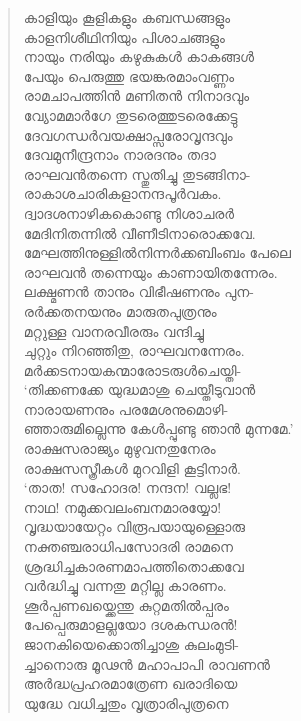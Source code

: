 \begin{verse}
കാളിയും കൂളികളും കബന്ധങ്ങളും\\
കാളനിശീഥിനിയും പിശാചങ്ങളും\\
നായും നരിയും കഴുകുകള്‍ കാകങ്ങള്‍\\
പേയും പെരുത്തു ഭയങ്കരമാംവണ്ണം\\
രാമചാപത്തിന്‍ മണിതന്‍ നിനാദവും\\
വ്യോമമാര്‍ഗേ തുടരെത്തുടരെക്കേട്ടു\\
ദേവഗന്ധര്‍വയക്ഷാപ്സരോവൃന്ദവും\\
ദേവമുനീന്ദ്രനാം നാരദനും തദാ\\
രാഘവന്‍തന്നെ സ്തുതിച്ചു തുടങ്ങിനാ-\\
രാകാശചാരികളാനന്ദപൂര്‍വകം.\\
ദ്വാദശനാഴികകൊണ്ടു നിശാചരര്‍\\
മേദിനിതന്നില്‍ വീണീടിനാരൊക്കവേ.\\
മേഘത്തിനുള്ളില്‍നിന്നര്‍ക്കബിംബം പേലെ\\
രാഘവന്‍ തന്നെയും കാണായിതന്നേരം.\\
ലക്ഷ്മണന്‍ താനും വിഭീഷണനും പുന-\\
രര്‍ക്കതനയനും മാരുതപുത്രനും\\
മറ്റുള്ള വാനരവീരരും വന്ദിച്ചു\\
ചുറ്റും നിറഞ്ഞിതു, രാഘവനന്നേരം.\\
മര്‍ക്കടനായകന്മാരോടരുള്‍ചെയ്തി-\\
‘തിക്കണക്കേ യുദ്ധമാശു ചെയ്തീടുവാന്‍\\
നാരായണനും പരമേശനുമൊഴി-\\
ഞ്ഞാരുമില്ലെന്നു കേള്‍പ്പുണ്ടു ഞാന്‍ മുന്നമേ.’\\
രാക്ഷസരാജ്യം മുഴുവനതുനേരം\\
രാക്ഷസസ്ത്രീകള്‍ മുറവിളി കൂട്ടിനാര്‍.\\
‘താത! സഹോദര! നന്ദന! വല്ലഭ!\\
നാഥ! നമുക്കവലംബനമാരയ്യോ!\\
വൃദ്ധയായേറ്റം വിരൂപയായുള്ളൊരു\\
നക്തഞ്ചരാധിപസോദരി രാമനെ\\
ശ്രദ്ധിച്ചകാരണമാപത്തിതൊക്കവേ\\
വര്‍ദ്ധിച്ചു വന്നതു മറ്റില്ല കാരണം.\\
ശൂര്‍പ്പണഖയ്ക്കെന്തു കുറ്റമതില്‍പ്പരം\\
പേപ്പെരുമാളല്ലയോ ദശകന്ധരന്‍!\\
ജാനകിയെക്കൊതിച്ചാശു കുലംമുടി-\\
ച്ചാനൊരു മൂഢന്‍ മഹാപാപി രാവണന്‍\\
അര്‍ദ്ധപ്രഹരമാത്രേണ ഖരാദിയെ\\
യുദ്ധേ വധിച്ചതും വൃത്രാരിപുത്രനെ\\

\end{verse}
